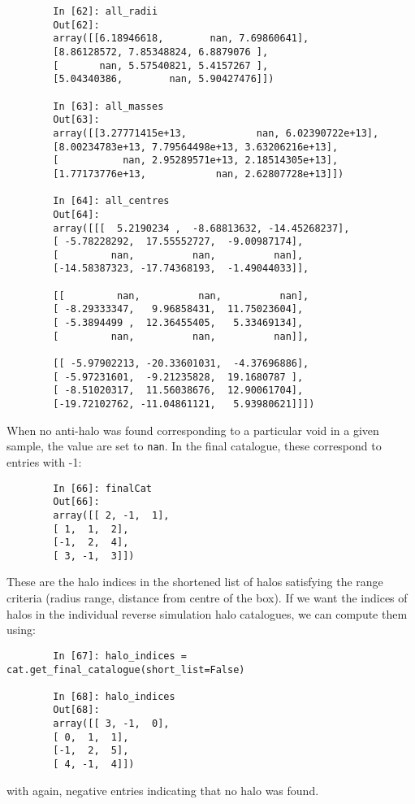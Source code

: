 \documentclass{article}
\newcommand{\codefont}[1]{{\texttt{#1}}}
\begin{document}
	\begin{verbatim}
		In [62]: all_radii
		Out[62]:
		array([[6.18946618,        nan, 7.69860641],
		[8.86128572, 7.85348824, 6.8879076 ],
		[       nan, 5.57540821, 5.4157267 ],
		[5.04340386,        nan, 5.90427476]])
		
		In [63]: all_masses
		Out[63]:
		array([[3.27771415e+13,            nan, 6.02390722e+13],
		[8.00234783e+13, 7.79564498e+13, 3.63206216e+13],
		[           nan, 2.95289571e+13, 2.18514305e+13],
		[1.77173776e+13,            nan, 2.62807728e+13]])
		
		In [64]: all_centres
		Out[64]:
		array([[[  5.2190234 ,  -8.68813632, -14.45268237],
		[ -5.78228292,  17.55552727,  -9.00987174],
		[         nan,          nan,          nan],
		[-14.58387323, -17.74368193,  -1.49044033]],
		
		[[         nan,          nan,          nan],
		[ -8.29333347,   9.96858431,  11.75023604],
		[ -5.3894499 ,  12.36455405,   5.33469134],
		[         nan,          nan,          nan]],
		
		[[ -5.97902213, -20.33601031,  -4.37696886],
		[ -5.97231601,  -9.21235828,  19.1680787 ],
		[ -8.51020317,  11.56038676,  12.90061704],
		[-19.72102762, -11.04861121,   5.93980621]]])
	\end{verbatim}
	When no anti-halo was found corresponding to a particular void in a given sample, the value are set to \codefont{nan}. In the final catalogue, these correspond to entries with -1:
	\begin{verbatim}
		In [66]: finalCat
		Out[66]:
		array([[ 2, -1,  1],
		[ 1,  1,  2],
		[-1,  2,  4],
		[ 3, -1,  3]])
	\end{verbatim}
	These are the halo indices in the shortened list of halos satisfying the range criteria (radius range, distance from centre of the box). If we want the indices of halos in the individual reverse simulation halo catalogues, we can compute them using:
	\begin{verbatim}
		In [67]: halo_indices = cat.get_final_catalogue(short_list=False)
		
		In [68]: halo_indices
		Out[68]:
		array([[ 3, -1,  0],
		[ 0,  1,  1],
		[-1,  2,  5],
		[ 4, -1,  4]])
	\end{verbatim}
	with again, negative entries indicating that no halo was found.
	
	
	
	
\end{document}

